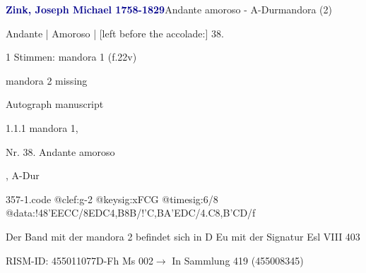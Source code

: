 \documentclass[twocolumn, 12pt]{book}
\begin{document}
\par \vspace{16pt} \textcolor{darkblue}{\textbf{Zink, Joseph Michael  1758-1829}}\hfillplus{\textbf{[357]}}\newline Andante amoroso - A-Dur\newline mandora (2)
\par \begin{itshape}[f.22v, at left:] Andante | Amoroso | [left before the accolade:] 38.\end{itshape} 
\par \textcolor{darkblue}{}  1 Stimmen: mandora 1  (f.22v)\newline \begin{small} mandora 2 missing\end{small} \newline Autograph manuscript
\par 1.1.1  mandora 1, \begin{itshape}Nr. 38. Andante amoroso\end{itshape}, A-Dur  
\begin{filecontents*}{357-1.code}
@clef:g-2
@keysig:xFCG
@timesig:6/8
@data:!48'EECC/8EDC4,B8B/!{'C,B}A'EDC/4.C8,B'CD/f
\end{filecontents*}
\newline %
\par Der Band mit der mandora 2 befindet sich in D Eu mit der Signatur Esl VIII 403
\par RISM-ID: 455011077\newline D-Fh  Ms 002\newline $\rightarrow$ In Sammlung 419 (455008345)
      
\end{document}
